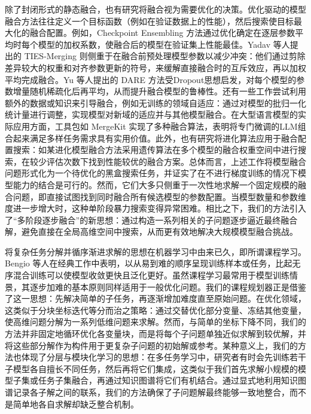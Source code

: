 \documentclass[../main.tex]{subfiles}
\begin{document}
除了封闭形式的静态融合，也有研究将融合视为需要优化的决策。优化驱动的模型融合方法往往定义一个目标函数（例如在验证数据上的性能），然后搜索使目标最大化的融合配置。例如，Checkpoint Ensembling 方法通过优化确定在逐层参数平均时每个模型的加权系数，使融合后的模型在验证集上性能最佳。Yadav 等人提出的 TIES-Merging 则侧重于在融合前预处理模型参数以减少冲突：他们通过剪除差异较大的权重和对齐参数更新的符号，来缓解直接融合时的互斥效应，再以加权平均完成融合。Yu 等人提出的 DARE 方法受Dropout思想启发，对每个模型的参数增量随机稀疏化后再平均，从而提升融合模型的鲁棒性。还有一些工作尝试利用额外的数据或知识来引导融合，例如无训练的领域自适应：通过对模型的批归一化统计量进行调整，实现模型对新域的适应并与其他模型融合。在大型语言模型的实际应用方面，工具包如 MergeKit 实现了多种融合算法，表明将专门微调的LLM组合起来满足多样任务需求具有实用价值。此外，也有研究将进化算法应用于融合配置搜索：如某进化模型融合方法采用遗传算法在多个模型的融合权重空间中进行搜索，在较少评估次数下找到性能较优的融合方案。总体而言，上述工作将模型融合问题形式化为一个待优化的黑盒搜索任务，并证实了在不进行梯度训练的情况下模型能力的结合是可行的。然而，它们大多只侧重于一次性地求解一个固定规模的融合问题，即直接试图找到同时融合所有候选模型的参数配置。当模型数量和参数维度进一步增大时，这种单阶段暴力搜索变得异常困难。相比之下，我们的方法引入了“多阶段逐步融合”的新思想：通过构造一系列相关的子问题逐步逼近最终融合解，避免直接在全局高维空间中搜索，从而更有效地解决大规模模型融合挑战。

将复杂任务分解并循序渐进求解的思想在机器学习中由来已久，即所谓课程学习。Bengio 等人在经典工作中表明，以从易到难的顺序呈现训练样本或任务，比起无序混合训练可以使模型收敛更快且泛化更好。虽然课程学习最常用于模型训练情景，其逐步加难的基本原则同样适用于一般优化问题。我们的课程规划器正是借鉴了这一思想：先解决简单的子任务，再逐渐增加难度直至原始问题。在优化领域，这类似于分块坐标迭代等分而治之策略：通过交替优化部分变量、冻结其他变量，使高维问题分解为一系列低维问题来求解。然而，与简单的坐标下降不同，我们的方法并非固定地循环优化各变量块，而是将每个子问题单独近似求解到较优解，并将这些部分解作为构件用于更复杂子问题的初始解或参考。某种意义上，我们的方法也体现了分层与模块化学习的思想：在多任务学习中，研究者有时会先训练若干子模型各自擅长不同任务，然后再将它们集成，这类似于我们首先求解小规模的模型子集或任务子集融合，再通过知识图谱将它们有机结合。通过显式地利用知识图谱记录各子解之间的联系，我们的方法确保了子问题解最终能够一致地整合，而不是简单地各自求解却缺乏整合机制。
\end{document}
